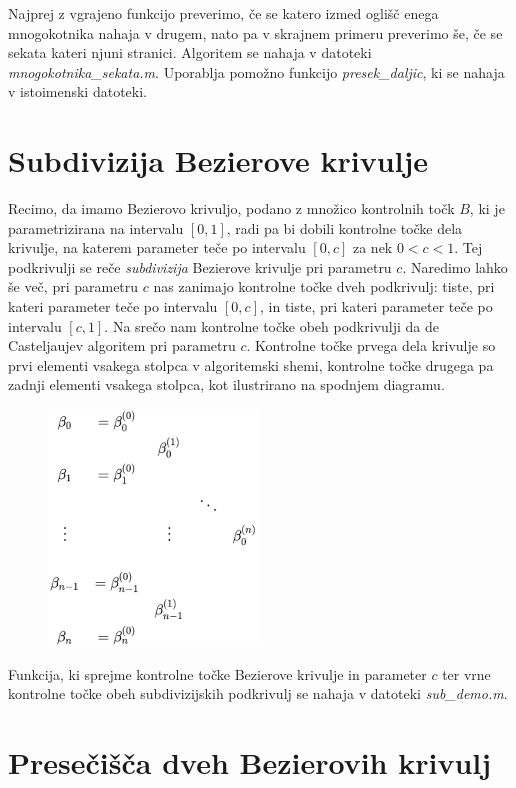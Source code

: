 \documentclass[a4paper, 12pt]{article} %
\begin{document}
Najprej z vgrajeno funkcijo preverimo, če se katero izmed oglišč enega mnogokotnika nahaja v drugem, nato pa v skrajnem primeru preverimo še, če se sekata kateri njuni stranici. Algoritem se nahaja v datoteki \emph{mnogokotnika\_sekata.m}. Uporablja pomožno funkcijo \emph{presek\_daljic}, ki se nahaja v istoimenski datoteki.

\section{Subdivizija Bezierove krivulje}

Recimo, da imamo Bezierovo krivuljo, podano z množico kontrolnih točk $B$, ki je parametrizirana na intervalu $[0, 1]$, radi pa bi dobili kontrolne točke dela krivulje, na katerem parameter teče po intervalu $[0, c]$ za nek $0 < c < 1$. Tej podkrivulji se reče \emph{subdivizija} Bezierove krivulje pri parametru $c$. Naredimo lahko še več, pri parametru $c$ nas zanimajo kontrolne točke dveh podkrivulj: tiste, pri kateri parameter teče po intervalu $[0, c]$, in tiste, pri kateri parameter teče po intervalu $[c, 1]$. Na srečo nam kontrolne točke obeh podkrivulji da de Casteljaujev algoritem pri parametru $c$. Kontrolne točke prvega dela krivulje so prvi elementi vsakega stolpca v algoritemski shemi, kontrolne točke drugega pa zadnji elementi vsakega stolpca, kot ilustrirano na spodnjem diagramu.

\begin{figure}[h]
\centering
\includegraphics[scale=0.5]{deCasteljau}
\end{figure}

Funkcija, ki sprejme kontrolne točke Bezierove krivulje in parameter $c$ ter vrne kontrolne točke obeh subdivizijskih podkrivulj se nahaja v datoteki \emph{sub\_demo.m}.


\section{Presečišča dveh Bezierovih krivulj}
\end{document}
